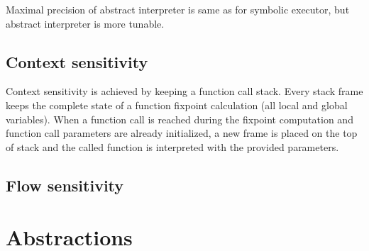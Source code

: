 \documentclass{article}
\begin{document}
Maximal precision of abstract interpreter is same as for symbolic
executor, but abstract interpreter is more tunable.

\subsection{Context sensitivity}
Context sensitivity is achieved by keeping a function call stack.
Every stack frame keeps the complete state of a function fixpoint
calculation (all local and global variables).  When a function call is
reached during the fixpoint computation and function call parameters
are already initialized, a new frame is placed on the top of stack and
the called function is interpreted with the provided parameters.

\subsection{Flow sensitivity}


\section{Abstractions}
\end{document}

